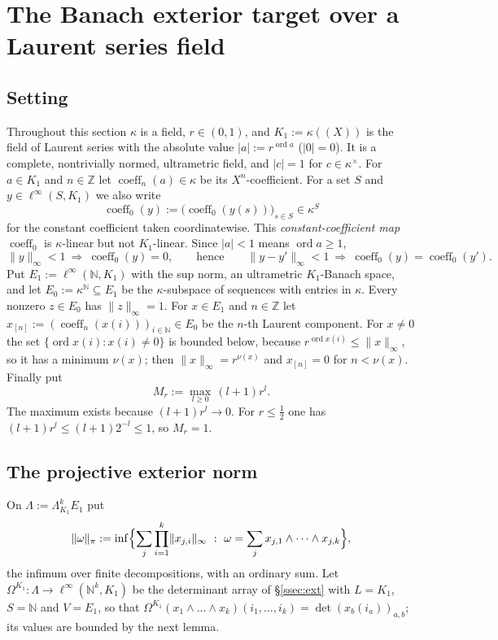 \documentclass[11pt]{amsart}
\theoremstyle{definition}
\theoremstyle{remark}
\numberwithin{equation}{section}
\newcommand{\linf}{\ell^\infty}
\newcommand{\N}{\mathbb{N}}
\newcommand{\Z}{\mathbb{Z}}
\newcommand{\coeff}{\operatorname{coeff}}
\newcommand{\ord}{\operatorname{ord}}
\newcommand{\abs}[1]{\lvert #1\rvert}
\newcommand{\norm}[1]{\lVert #1\rVert}
\begin{document}
\section{The Banach exterior target over a Laurent series field}\label{sec:laurent}

\subsection{Setting}\label{ssec:laurentsetting}
Throughout this section $\kappa$ is a field, $r\in(0,1)$, and $K_1:=\kappa((X))$ is the field of Laurent series with the
absolute value $\abs a:=r^{\ord a}$ ($\abs0=0$). It is a complete, nontrivially normed, ultrametric field, and $\abs
c=1$ for $c\in\kappa^\times$. For $a\in K_1$ and $n\in\Z$ let $\coeff_n(a)\in\kappa$ be its $X^n$\nobreakdash-coefficient. For a set
$S$ and $y\in\linf(S,K_1)$ we also write
\[
\coeff_0(y):=\bigl(\coeff_0(y(s))\bigr)_{s\in S}\in\kappa^S
\]
for the constant coefficient taken coordinatewise. This \emph{constant-coefficient map} $\coeff_0$ is $\kappa$\nobreakdash-linear but not $K_1$\nobreakdash-linear. Since $\abs a<1$ means $\ord a\ge1$,
\begin{equation}\label{eq:small}
\norm y_\infty<1\ \Longrightarrow\ \coeff_0(y)=0,\qquad\text{hence}\qquad \norm{y-y'}_\infty<1\ \Longrightarrow\ \coeff_0(y)=\coeff_0(y').
\end{equation}
Put $E_1:=\linf(\N,K_1)$ with the sup norm, an ultrametric $K_1$\nobreakdash-Banach space, and let $E_0:=\kappa^\N\subseteq E_1$ be
the $\kappa$\nobreakdash-subspace of sequences with entries in $\kappa$. Every nonzero $z\in E_0$ has $\norm z_\infty=1$. For
$x\in E_1$ and $n\in\Z$ let $x_{[n]}:=(\coeff_n(x(i)))_{i\in\N}\in E_0$ be the $n$\nobreakdash-th Laurent component. For $x\ne0$
the set $\{\ord x(i):x(i)\ne0\}$ is bounded below, because $r^{\ord x(i)}\le\norm x_\infty$, so it has a minimum
$\nu(x)$; then $\norm x_\infty=r^{\nu(x)}$ and $x_{[n]}=0$ for $n<\nu(x)$. Finally put
\[
M_r:=\max_{l\ge0}\,(l+1)r^l .
\]
The maximum exists because $(l+1)r^l\to0$. For $r\le\frac12$ one has $(l+1)r^l\le(l+1)2^{-l}\le1$, so $M_r=1$.

\subsection{The projective exterior norm}\label{ssec:projnorm}
On $\Lambda:=\Lambda^k_{K_1}E_1$ put
\[
\norm\omega_\pi:=\inf\Bigl\{\sum_j\prod_{i=1}^k\norm{x_{j,i}}_\infty\ :\ \omega=\sum_jx_{j,1}\wedge\dots\wedge x_{j,k}\Bigr\},
\]
the infimum over finite decompositions, with an ordinary sum. Let $\Omega^{K_1}\colon\Lambda\to\linf(\N^k,K_1)$ be the determinant
array of \S\ref{ssec:ext} with $L=K_1$, $S=\N$ and $V=E_1$, so that
$\Omega^{K_1}(x_1\wedge\dots\wedge x_k)(i_1,\dots,i_k)=\det(x_b(i_a))_{a,b}$; its values are bounded by the next lemma.
\end{document}
